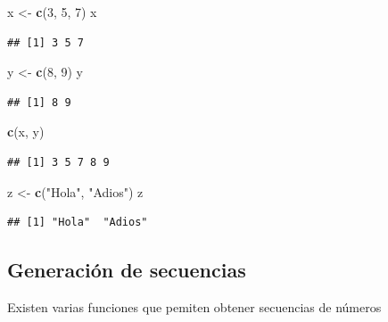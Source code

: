 \documentclass[]{book}
\newenvironment{Shaded}{\begin{snugshade}}{\end{snugshade}}
\newcommand{\DecValTok}[1]{\textcolor[rgb]{0.00,0.00,0.81}{#1}}
\newcommand{\KeywordTok}[1]{\textcolor[rgb]{0.13,0.29,0.53}{\textbf{#1}}}
\newcommand{\NormalTok}[1]{#1}
\newcommand{\StringTok}[1]{\textcolor[rgb]{0.31,0.60,0.02}{#1}}
\begin{document}
\begin{Shaded}
\begin{Highlighting}[]
\NormalTok{x <-}\StringTok{ }\KeywordTok{c}\NormalTok{(}\DecValTok{3}\NormalTok{, }\DecValTok{5}\NormalTok{, }\DecValTok{7}\NormalTok{)}
\NormalTok{x}
\end{Highlighting}
\end{Shaded}

\begin{verbatim}
## [1] 3 5 7
\end{verbatim}

\begin{Shaded}
\begin{Highlighting}[]
\NormalTok{y <-}\StringTok{ }\KeywordTok{c}\NormalTok{(}\DecValTok{8}\NormalTok{, }\DecValTok{9}\NormalTok{)}
\NormalTok{y}
\end{Highlighting}
\end{Shaded}

\begin{verbatim}
## [1] 8 9
\end{verbatim}

\begin{Shaded}
\begin{Highlighting}[]
\KeywordTok{c}\NormalTok{(x, y)}
\end{Highlighting}
\end{Shaded}

\begin{verbatim}
## [1] 3 5 7 8 9
\end{verbatim}

\begin{Shaded}
\begin{Highlighting}[]
\NormalTok{z <-}\StringTok{ }\KeywordTok{c}\NormalTok{(}\StringTok{"Hola"}\NormalTok{, }\StringTok{"Adios"}\NormalTok{)}
\NormalTok{z}
\end{Highlighting}
\end{Shaded}

\begin{verbatim}
## [1] "Hola"  "Adios"
\end{verbatim}

\hypertarget{generacion-de-secuencias}{%
\subsection{Generación de secuencias}\label{generacion-de-secuencias}}

Existen varias funciones que pemiten obtener secuencias de números
\end{document}
